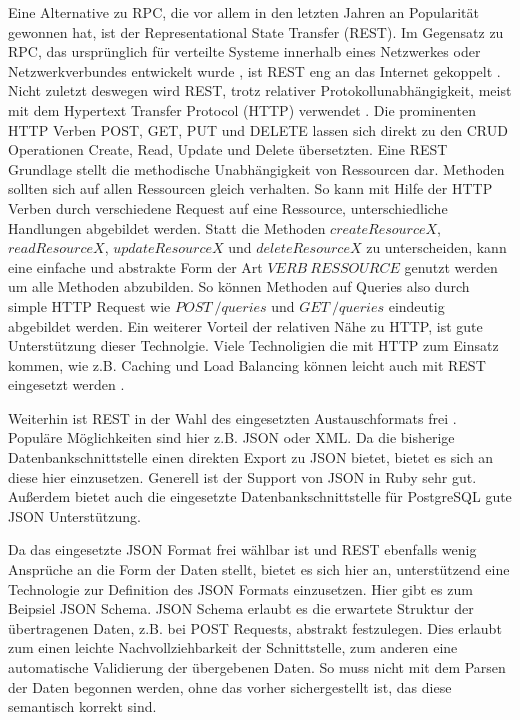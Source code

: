 Eine Alternative zu RPC, die vor allem in den letzten Jahren an Popularität gewonnen hat, ist der Representational State Transfer (REST). Im Gegensatz zu RPC, das ursprünglich für verteilte Systeme innerhalb eines Netzwerkes oder Netzwerkverbundes entwickelt wurde \cite{rpc:history}, ist REST eng an das Internet gekoppelt \cite[vgl.][Seite 49]{newman2015building}. Nicht zuletzt deswegen wird REST, trotz relativer Protokollunabhängigkeit, meist mit dem Hypertext Transfer Protocol (HTTP) verwendet \cite[vgl.][Seite 50]{newman2015building}. Die prominenten HTTP Verben POST, GET, PUT und DELETE lassen sich direkt zu den CRUD Operationen Create, Read, Update und Delete übersetzten. Eine REST Grundlage stellt die methodische Unabhängigkeit von Ressourcen dar. Methoden sollten sich auf allen Ressourcen gleich verhalten. So kann mit Hilfe der HTTP Verben durch verschiedene Request auf eine Ressource, unterschiedliche Handlungen abgebildet werden. Statt die Methoden $createResourceX$, $readResourceX$, $updateResourceX$ und $deleteResourceX$ zu unterscheiden, kann eine einfache und abstrakte Form der Art $VERB\ RESSOURCE$ genutzt werden um alle Methoden abzubilden. So können Methoden auf Queries also durch simple HTTP Request wie $POST\ /queries$ und $GET\ /queries$ eindeutig abgebildet werden. Ein weiterer Vorteil der relativen Nähe zu HTTP, ist gute Unterstützung dieser Technolgie. Viele Technoligien die mit HTTP zum Einsatz kommen, wie z.B. Caching und Load Balancing können leicht auch mit REST eingesetzt werden \cite{rest:loadbalancing}.

Weiterhin ist REST in der Wahl des eingesetzten Austauschformats frei \cite[][Seite 53]{newman2015building}. Populäre Möglichkeiten sind hier z.B. JSON oder XML. Da die bisherige Datenbankschnittstelle einen direkten Export zu JSON bietet, bietet es sich an diese hier einzusetzen. Generell ist der Support von JSON in Ruby sehr gut. Außerdem bietet auch die eingesetzte Datenbankschnittstelle \cite{sequel} für PostgreSQL gute JSON Unterstützung.

Da das eingesetzte JSON Format frei wählbar ist und REST ebenfalls wenig Ansprüche an die Form der Daten stellt, bietet es sich hier an, unterstützend eine Technologie zur Definition des JSON Formats einzusetzen. Hier gibt es zum Beipsiel JSON Schema. JSON Schema erlaubt es die erwartete Struktur der übertragenen Daten, z.B. bei POST Requests, abstrakt festzulegen. Dies erlaubt zum einen leichte Nachvollziehbarkeit der Schnittstelle, zum anderen eine automatische Validierung der übergebenen Daten. So muss nicht mit dem Parsen der Daten begonnen werden, ohne das vorher sichergestellt ist, das diese semantisch korrekt sind.

